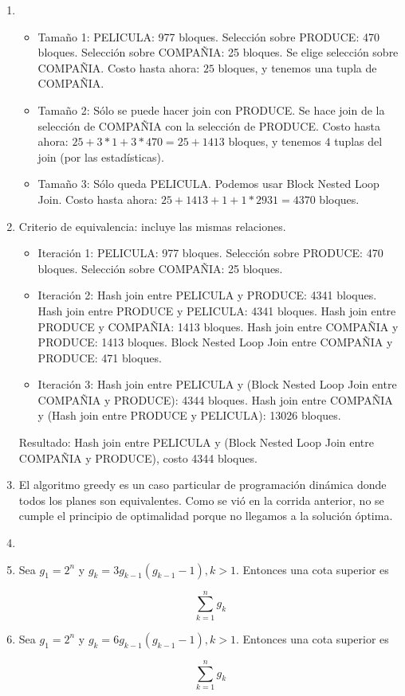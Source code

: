 \documentclass[10pt]{article}
\begin{document}
\begin{enumerate}
 \item

\begin{itemize}
 \item Tamaño 1: PELICULA: 977 bloques. Selección sobre PRODUCE: 470 bloques. Selección sobre COMPAÑIA: 25 bloques.
       Se elige selección sobre COMPAÑIA. Costo hasta ahora: $25$ bloques, y tenemos una tupla de COMPAÑIA.
 \item Tamaño 2: Sólo se puede hacer join con PRODUCE. Se hace join de la selección de COMPAÑIA con la selección de PRODUCE.
       Costo hasta ahora: $25+3*1+3*470=25+1413$ bloques, y tenemos $4$ tuplas del join (por las estadísticas).
 \item Tamaño 3: Sólo queda PELICULA. Podemos usar Block Nested Loop Join. Costo hasta ahora: $25+1413+1+1*2931=4370$ bloques.
\end{itemize}

 \item

Criterio de equivalencia: incluye las mismas relaciones.

\begin{itemize}
 \item Iteración 1: PELICULA: 977 bloques. Selección sobre PRODUCE: 470 bloques. Selección sobre COMPAÑIA: 25 bloques.
 \item Iteración 2: Hash join entre PELICULA y PRODUCE: 4341 bloques. Hash join entre PRODUCE y PELICULA: 4341 bloques.
       Hash join entre PRODUCE y COMPAÑIA: 1413 bloques. Hash join entre COMPAÑIA y PRODUCE: 1413 bloques. Block Nested Loop Join
       entre COMPAÑIA y PRODUCE: 471 bloques.
 \item Iteración 3: Hash join entre PELICULA y (Block Nested Loop Join entre COMPAÑIA y PRODUCE): 4344 bloques. Hash join entre
       COMPAÑIA y (Hash join entre PRODUCE y PELICULA): 13026 bloques.
\end{itemize}

Resultado: Hash join entre PELICULA y (Block Nested Loop Join entre COMPAÑIA y PRODUCE), costo 4344 bloques.

 \item

El algoritmo greedy es un caso particular de programación dinámica donde todos los
planes son equivalentes. Como se vió en la corrida anterior, no se cumple el principio
de optimalidad porque no llegamos a la solución óptima.

 \item

 \item

Sea $g_1 = 2^n$ y $g_k = 3g_{k-1}(g_{k-1}-1), k > 1$. Entonces una cota superior es

$$
\sum_{k=1}^n g_k
$$

 \item

Sea $g_1 = 2^n$ y $g_k = 6g_{k-1}(g_{k-1}-1), k > 1$. Entonces una cota superior es

$$
\sum_{k=1}^n g_k
$$

\end{enumerate}
\end{document}

